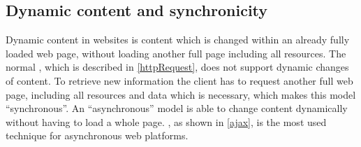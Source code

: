 \subsection{Dynamic content and synchronicity\label{synchronicity}}
Dynamic content in websites is content which is changed within an already fully loaded web page, without loading another full page including all resources. 
The normal \httpRequest{}, which is described in \ref{httpRequest}, does not support dynamic changes of content. 
To retrieve new information the client has to request another full web page, including all resources and data which is necessary, which makes this model \enquote{synchronous}.
An \enquote{asynchronous} model is able to change content dynamically without having to load a whole page. 
\ajax{}, as shown in \ref{ajax}, is the most used technique for asynchronous web platforms.

